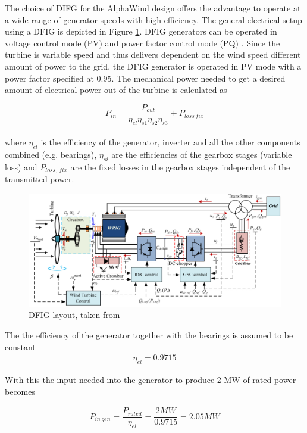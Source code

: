 The choice of DIFG for the AlphaWind design offers the advantage to operate at a wide range of generator speeds with high efficiency. The general electrical setup using a DFIG is depicted in Figure \ref{fig:DFIG_figure}. DFIG generators can be operated in voltage control mode (PV) and power factor control mode (PQ) \cite{Londero2012}. Since the turbine is variable speed and thus delivers dependent on the wind speed different amount of power to the grid, the DFIG generator is operated in PV mode with a power factor specified at 0.95. The mechanical power needed to get a desired amount of electrical power out of the turbine is calculated as

\begin{equation}
    P_{in} = \dfrac{P_{out}}{\eta_{el}\eta_{s1}\eta_{s2}\eta_{s3}} + P_{loss\,fix}
    \label{eq:P_in}
\end{equation}
\\
where $\eta_{el}$ is the efficiency of the generator, inverter and all the other components combined (e.g. bearings), $\eta_{si}$ are the efficiencies of the gearbox stages (variable loss) and $P_{loss, \, fix}$ are the fixed losses in the gearbox stages independent of the transmitted power.

\begin{figure}[H]
\centering
\includegraphics[width=1\textwidth]{Images/DFIG_figure.png} 
\caption{DFIG layout, taken from \cite{Le2016}}
\label{fig:DFIG_figure}
\end{figure}



The the efficiency of the generator together with the bearings is assumed to be constant
\begin{align}
    \eta_{el} = 0.9715
\end{align}

With this the input needed into the generator to produce 2 MW of rated power becomes

\begin{align}
    P_{in\,gen} = \dfrac{P_{rated}}{\eta_{el}} = \dfrac{2 MW}{0.9715} = 2.05 MW
\end{align}

